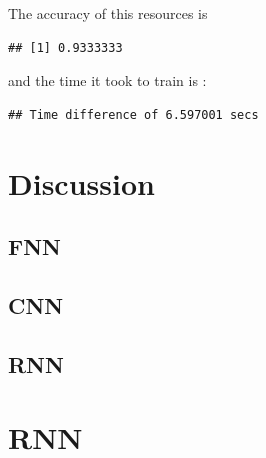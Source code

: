 \documentclass[letter]{article}\usepackage[]{graphicx}\usepackage[]{color}
\makeatletter
\newenvironment{kframe}{%
 \def\at@end@of@kframe{}%
 \ifinner\ifhmode%
  \def\at@end@of@kframe{\end{minipage}}%
  \begin{minipage}{\columnwidth}%
 \fi\fi%
 \def\FrameCommand##1{\hskip\@totalleftmargin \hskip-\fboxsep
 \colorbox{shadecolor}{##1}\hskip-\fboxsep
     \hskip-\linewidth \hskip-\@totalleftmargin \hskip\columnwidth}%
 \MakeFramed {\advance\hsize-\width
   \@totalleftmargin\z@ \linewidth\hsize
   \@setminipage}}%
 {\par\unskip\endMakeFramed%
 \at@end@of@kframe}
\newenvironment{knitrout}{}{} %
\makeatother
\begin{document}
The accuracy of this resources is
\begin{knitrout}
\color{fgcolor}\begin{kframe}
\begin{verbatim}
## [1] 0.9333333
\end{verbatim}
\end{kframe}
\end{knitrout}
and the time it took to train is :
\begin{knitrout}
\color{fgcolor}\begin{kframe}
\begin{verbatim}
## Time difference of 6.597001 secs
\end{verbatim}
\end{kframe}
\end{knitrout}


\section{Discussion}
\subsection{FNN}
\subsection{CNN}
\subsection{RNN}
\section{RNN}

\newpage
\pagestyle{plain}

\end{document}
